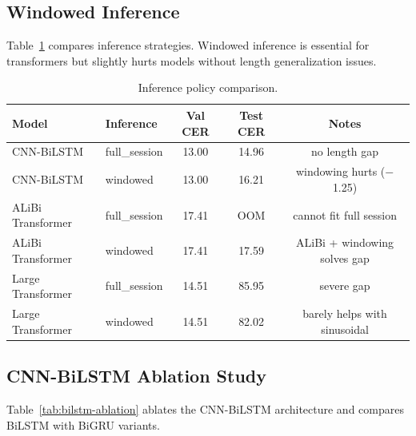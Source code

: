 \documentclass{article}
\begin{document}
\subsection{Windowed Inference}

Table~\ref{tab:inference} compares inference strategies. Windowed inference is essential for transformers but slightly hurts models without length generalization issues.

\begin{table}[h]
\centering
\small
\caption{Inference policy comparison.}
\label{tab:inference}
\begin{tabular}{llccc}
\toprule
\textbf{Model} & \textbf{Inference} & \textbf{Val CER} & \textbf{Test CER} & \textbf{Notes} \\
\midrule
CNN-BiLSTM & full\_session & 13.00 & 14.96 & no length gap \\
CNN-BiLSTM & windowed & 13.00 & 16.21 & windowing hurts ($-$1.25) \\
\midrule
ALiBi Transformer & full\_session & 17.41 & OOM & cannot fit full session \\
ALiBi Transformer & windowed & 17.41 & 17.59 & ALiBi + windowing solves gap \\
\midrule
Large Transformer & full\_session & 14.51 & 85.95 & severe gap \\
Large Transformer & windowed & 14.51 & 82.02 & barely helps with sinusoidal \\
\bottomrule
\end{tabular}
\end{table}


\subsection{CNN-BiLSTM Ablation Study}

Table~\ref{tab:bilstm-ablation} ablates the CNN-BiLSTM architecture and compares BiLSTM with BiGRU variants.
\end{document}
